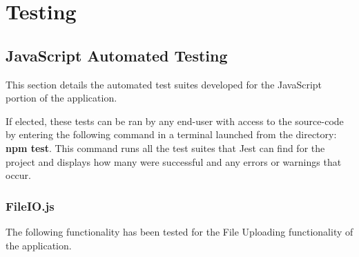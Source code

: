 \section{Testing}
\subsection{JavaScript Automated Testing}
This section details the automated test suites developed for the JavaScript portion of the application. 

If elected, these tests can be ran by any end-user with access to the source-code by entering the following command in a terminal launched from the directory: {\bf npm test}. This command runs all the test suites that Jest can find for the project and displays how many were successful and any errors or warnings that occur. 

\subsubsection{FileIO.js}
The following functionality has been tested for the File Uploading functionality of the application. 

